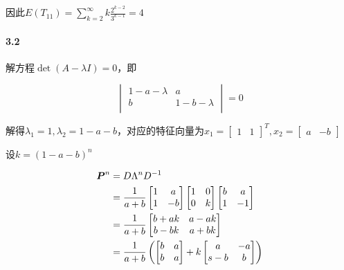 \documentclass{article}
\begin{document}
    因此$E(T_{11}) = \sum_{k=2}^\infty k\frac{2^{k-2}}{3^{k-1}} = 4$

    \paragraph*{3.2} 解方程$\det (A - \lambda I) = 0$，即

    \begin{equation}
        \begin{vmatrix}
            1 - a - \lambda & a \\
            b & 1 - b - \lambda \\
        \end{vmatrix} = 0
    \end{equation}

    解得$\lambda_1 = 1, \lambda_2 = 1 - a - b$，对应的特征向量为$x_1 = \begin{bmatrix} 1 & 1 \end{bmatrix}^T, x_2 = \begin{bmatrix} a & -b \end{bmatrix}$

    设$k = (1 - a - b)^n$

    \begin{equation}
        \begin{aligned}
            \boldsymbol P^n &= D\Lambda^n D^{-1}  \\
            &= \frac{1}{a+b}\begin{bmatrix}
                1 & a \\
                1 & -b \\
            \end{bmatrix}\begin{bmatrix}
                1 & 0 \\
                0 & k
            \end{bmatrix}\begin{bmatrix}
                b & a \\
                1 & -1 \\
            \end{bmatrix} \\
            &= \frac {1}{a+b}\begin{bmatrix}
                b + ak & a - ak \\
                b - bk & a + bk \\
            \end{bmatrix} \\
            &= \frac {1}{a+b}\left(\begin{bmatrix}
                b & a \\
                b & a
            \end{bmatrix} + k\begin{bmatrix}
                a & -a \\s
                -b & b
            \end{bmatrix}\right)
        \end{aligned}
    \end{equation}
\end{document}
